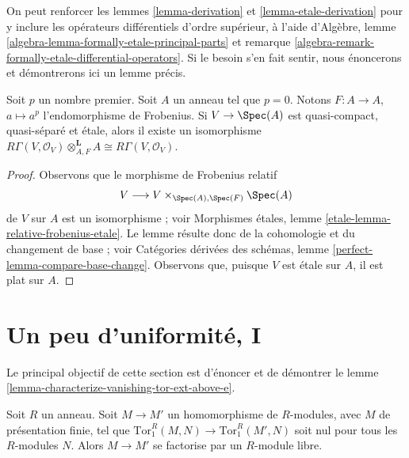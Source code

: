 \begin{remark}
\label{remark-higher-order-operators}
On peut renforcer les lemmes \ref{lemma-derivation} et \ref{lemma-etale-derivation} pour y inclure les opérateurs différentiels d'ordre supérieur, à l'aide d'Algèbre, lemme \ref{algebra-lemma-formally-etale-principal-parts} et remarque \ref{algebra-remark-formally-etale-differential-operators}. Si le besoin s'en fait sentir, nous énoncerons et démontrerons ici un lemme précis.
\end{remark}

\begin{lemma}
\label{lemma-etale-frobenius}
Soit $p$ un nombre premier. Soit $A$ un anneau tel que $p = 0$. Notons $F : A \to A$, $a \mapsto a^p$ l'endomorphisme de Frobenius. Si $V \to \Spec(A)$ est quasi-compact, quasi-séparé et \'etale, alors il existe un isomorphisme $R\Gamma(V, \mathcal{O}_V) \otimes_{A, F}^\mathbf{L} A \cong
R\Gamma(V, \mathcal{O}_V)$.
\end{lemma}

\begin{proof}
Observons que le morphisme de Frobenius relatif
$$
V \longrightarrow V \times_{\Spec(A), \Spec(F)} \Spec(A)
$$
de $V$ sur $A$ est un isomorphisme ; voir Morphismes \'etales, lemme \ref{etale-lemma-relative-frobenius-etale}. Le lemme résulte donc de la cohomologie et du changement de base ; voir Catégories dérivées des schémas, lemme \ref{perfect-lemma-compare-base-change}. Observons que, puisque $V$ est \'etale sur $A$, il est plat sur $A$.
\end{proof}





\section{Un peu d'uniformité, I}
\label{section-uniform-vanishing}

\noindent
Le principal objectif de cette section est d'énoncer et de démontrer le lemme \ref{lemma-characterize-vanishing-tor-ext-above-e}.

\begin{lemma}
\label{lemma-map-tor-1-zero}
Soit $R$ un anneau. Soit $M \to M'$ un homomorphisme de $R$-modules, avec $M$ de présentation finie, tel que $\text{Tor}_1^R(M, N) \to \text{Tor}_1^R(M', N)$ soit nul pour tous les $R$-modules $N$. Alors $M \to M'$ se factorise par un $R$-module libre.
\end{lemma}

